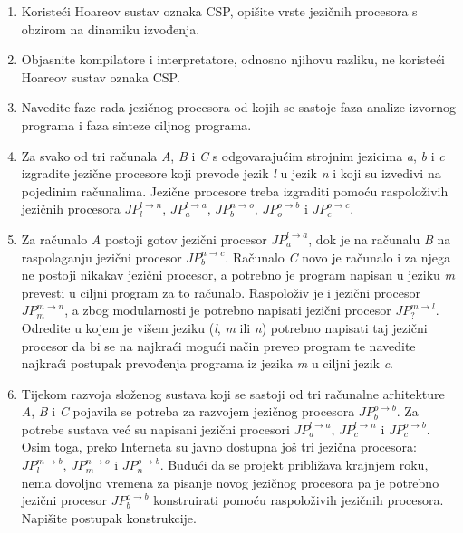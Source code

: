 \documentclass[times, 12pt, utf8]{book}
\newcommand{\JP}[3]{\(JP_{#1}^{#2 \to #3}\)}
\begin{document}
\begin{enumerate}
\item
Koristeći Hoareov sustav oznaka CSP, opišite vrste jezičnih procesora s obzirom na dinamiku izvođenja. \cite[str.~24]{udzbenik}

\item
Objasnite kompilatore i interpretatore, odnosno njihovu razliku, ne koristeći Hoareov sustav oznaka CSP. \cite[str.~24-26]{udzbenik}

\item
Navedite faze rada jezičnog procesora od kojih se sastoje faza analize izvornog programa i faza sinteze ciljnog programa. \cite[str.~3-4]{udzbenik} \cite{auditorne}

\item
Za svako od tri računala \textit{A}, \textit{B} i \textit{C} s odgovarajućim strojnim jezicima \textit{a}, \textit{b} i \textit{c} izgradite jezične procesore koji prevode jezik \textit{l} u jezik \textit{n} i koji su izvedivi na pojedinim računalima. 
Jezične procesore treba izgraditi pomoću raspoloživih jezičnih procesora \JP{l}{l}{n}, \JP{a}{l}{a}, \JP{b}{n}{o}, \JP{o}{o}{b} i \JP{c}{o}{c}. \cite[str.~27]{udzbenik}

\item
Za računalo \textit{A} postoji gotov jezični procesor \JP{a}{l}{a}, dok je na računalu \textit{B} na raspolaganju jezični procesor \JP{b}{n}{c}.
Računalo \textit{C} novo je računalo i za njega ne postoji nikakav jezični procesor, a potrebno je program napisan u jeziku \textit{m} prevesti u ciljni program za to računalo.
Raspoloživ je i jezični procesor \JP{m}{m}{n}, a zbog modularnosti je potrebno napisati jezični procesor \JP{?}{m}{l}.
Odredite u kojem je višem jeziku (\textit{l}, \textit{m} ili \textit{n}) potrebno napisati taj jezični procesor da bi se na najkraći mogući način preveo program te navedite najkraći postupak prevođenja programa iz jezika \textit{m} u ciljni jezik \textit{c}. \cite[str.~27]{udzbenik}  \cite{auditorne}

\item
Tijekom razvoja složenog sustava koji se sastoji od tri računalne arhitekture \textit{A}, \textit{B} i \textit{C} pojavila se potreba za razvojem jezičnog procesora \JP{b}{o}{b}.
Za potrebe sustava već su napisani jezični procesori \JP{a}{l}{a}, \JP{c}{l}{n} i \JP{c}{o}{b}.
Osim toga, preko Interneta su javno dostupna još tri jezična procesora: \JP{l}{m}{b}, \JP{m}{n}{o} i \JP{n}{o}{b}.
Budući da se projekt približava krajnjem roku, nema dovoljno vremena za pisanje novog jezičnog procesora pa je potrebno jezični procesor \JP{b}{o}{b} konstruirati pomoću raspoloživih jezičnih procesora. 
Napišite postupak konstrukcije. \cite[str.~27]{udzbenik} \cite{auditorne}


\end{enumerate}
\end{document}
